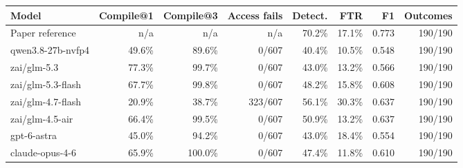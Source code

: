\begin{tabular}{lrrrrrrr}
\toprule
Model & Compile@1 & Compile@3 & Access fails & Detect. & FTR & F1 & Outcomes \\
\midrule
Paper reference & n/a & n/a & n/a & 70.2\% & 17.1\% & 0.773 & 190/190 \\
qwen3.8-27b-nvfp4 & 49.6\% & 89.6\% & 0/607 & 40.4\% & 10.5\% & 0.548 & 190/190 \\
zai/glm-5.3 & 77.3\% & 99.7\% & 0/607 & 43.0\% & 13.2\% & 0.566 & 190/190 \\
zai/glm-5.3-flash & 67.7\% & 99.8\% & 0/607 & 48.2\% & 15.8\% & 0.608 & 190/190 \\
zai/glm-4.7-flash & 20.9\% & 38.7\% & 323/607 & 56.1\% & 30.3\% & 0.637 & 190/190 \\
zai/glm-4.5-air & 66.4\% & 99.5\% & 0/607 & 50.9\% & 13.2\% & 0.637 & 190/190 \\
gpt-6-astra & 45.0\% & 94.2\% & 0/607 & 43.0\% & 18.4\% & 0.554 & 190/190 \\
claude-opus-4-6 & 65.9\% & 100.0\% & 0/607 & 47.4\% & 11.8\% & 0.610 & 190/190 \\
\bottomrule
\end{tabular}
\par{}
